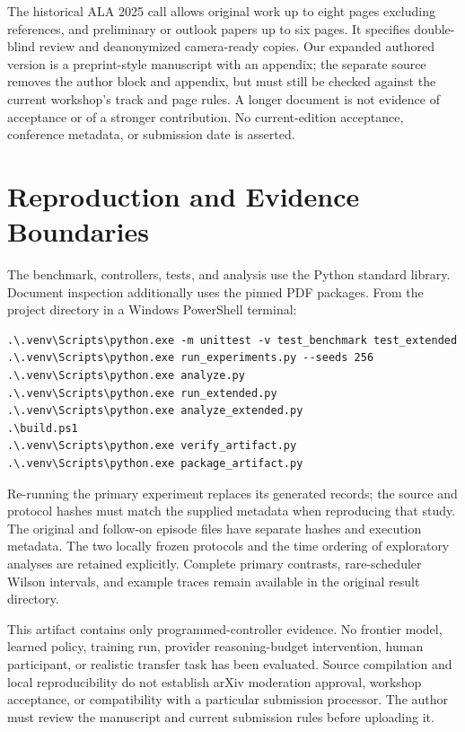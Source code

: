 The historical ALA 2025 call allows original work up to eight pages
excluding references, and preliminary or outlook papers up to six pages.
It specifies double-blind review and deanonymized camera-ready copies.
Our expanded authored version is a preprint-style manuscript with an
appendix; the separate  source removes the author block
and appendix, but must still be checked against the current workshop's
track and page rules. A longer document is not evidence of acceptance
or of a stronger contribution. No current-edition acceptance, conference
metadata, or submission date is asserted.

\section{Reproduction and Evidence Boundaries}
The benchmark, controllers, tests, and analysis use the Python standard
library. Document inspection additionally uses the pinned PDF packages.
From the project directory in a Windows PowerShell terminal:
\begin{verbatim}
.\.venv\Scripts\python.exe -m unittest -v test_benchmark test_extended
.\.venv\Scripts\python.exe run_experiments.py --seeds 256
.\.venv\Scripts\python.exe analyze.py
.\.venv\Scripts\python.exe run_extended.py
.\.venv\Scripts\python.exe analyze_extended.py
.\build.ps1
.\.venv\Scripts\python.exe verify_artifact.py
.\.venv\Scripts\python.exe package_artifact.py
\end{verbatim}
Re-running the primary experiment replaces its generated records;
the source and protocol hashes must match the supplied metadata when
reproducing that study. The original and follow-on episode files have
separate hashes and execution metadata. The two locally frozen protocols
and the time ordering of exploratory analyses are retained explicitly.
Complete primary contrasts, rare-scheduler Wilson intervals, and example
traces remain available in the original result directory.

This artifact contains only programmed-controller evidence. No frontier
model, learned policy, training run, provider reasoning-budget intervention,
human participant, or realistic transfer task has been evaluated.
Source compilation and local reproducibility do not establish arXiv
moderation approval, workshop acceptance, or compatibility with a
particular submission processor. The author must review the manuscript
and current submission rules before uploading it.
